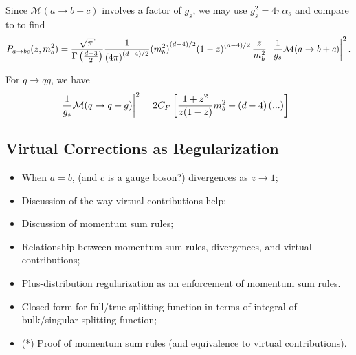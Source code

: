 \begin{subappendices}
Since \(\mathcal{M}(a \to b + c)\) involves a factor of \(g_s\), we may use \(g_s^2 = 4\pi \alpha_s\) and compare to  to find
\begin{equation}
    P_{a\to bc}(z, m_b^2)
    =
    \frac{\sqrt{\pi}}
    {\Gamma\le(\frac{d-3}{2}\ri)}
    \frac{1}{{(4\pi)}^{(d-4)/2}}
    {(m_b^2)}^{(d-4)/2}
    {(1-z)}^{(d-4)/2}
    \,
    \frac{z}{m_b^2}
    \,
    \le| \frac{1}{g_s} \mathcal{M}(a \to b + c) \ri|^2
    .
    \label{eq:splitting_function}
\end{equation}




For \(q \to q g\), we have
\begin{align}
    \left| \frac{1}{g_s} \mathcal{M}(q \to q + g) \right|^2
    &=
    2 C_F \left[
        \frac{1 + z^2}{z(1 - z)} m_b^2
        +
        (d-4)
        \left(...\right)
    \right]
\end{align}


\subsection{Virtual Corrections as Regularization}

\begin{itemize}
    \item
    When \(a = b\), (and \(c\) is a gauge boson?) divergences as \(z \to 1\);

    \item
    Discussion of the way virtual contributions help;

   \item
    Discussion of momentum sum rules;

    \item
    Relationship between momentum sum rules, divergences, and virtual contributions;

    \item
    Plus-distribution regularization as an enforcement of momentum sum rules.

    \item
    Closed form for full/true splitting function in terms of integral of bulk/singular splitting function;

    \item
    (*) Proof of momentum sum rules (and equivalence to virtual contributions).


\end{itemize}
\end{subappendices}
